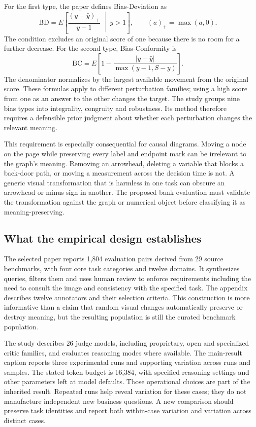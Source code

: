 For the first type, the paper defines Bias-Deviation as
\[
 \mathrm{BD}=E\left[\frac{(y-\widehat y)_+}{y-1}\;\middle|\;y>1\right],
 \qquad (a)_+=\max(a,0).
\]
The condition excludes an original score of one because there is no room
for a further decrease. For the second type, Bias-Conformity is
\[
 \mathrm{BC}=E\left[1-
 \frac{|y-\widehat y|}{\max(y-1,S-y)}\right].
\]
The denominator normalizes by the largest available movement from the
original score. These formulas apply to different perturbation families;
using a high score from one as an answer to the other changes the target.
The study groups nine bias types into integrality, congruity and robustness.
Its method therefore requires a defensible prior judgment about whether
each perturbation changes the relevant meaning.
\citep{exec24_judgebias_original}

This requirement is especially consequential for causal diagrams. Moving a
node on the page while preserving every label and endpoint mark can be
irrelevant to the graph's meaning. Removing an arrowhead, deleting a variable
that blocks a back-door path, or moving a measurement across the decision
time is not. A generic visual transformation that is harmless in one task
can obscure an arrowhead or minus sign in another. The proposed bank
evaluation must validate the transformation against the graph or numerical
object before classifying it as meaning-preserving.
\citep{exec24_judgebias_reference}

\subsection{What the empirical design establishes}

The selected paper reports 1,804 evaluation pairs derived from 29 source
benchmarks, with four core task categories and twelve domains. It synthesizes
queries, filters them and uses human review to enforce requirements including
the need to consult the image and consistency with the specified task.
The appendix describes twelve annotators and their selection criteria. This
construction is more informative than a claim that random visual changes
automatically preserve or destroy meaning, but the resulting population is
still the curated benchmark population.\citep{exec24_judgebias_original}

The study describes 26 judge models, including proprietary, open and
specialized critic families, and evaluates reasoning modes where available.
The main-result caption reports three experimental runs and supporting
variation across runs and samples. The stated token budget is 16,384, with
specified reasoning settings and other parameters left at model defaults.
Those operational choices are part of the inherited result. Repeated runs
help reveal variation for these cases; they do not manufacture independent
new business questions. A new comparison should preserve task identities
and report both within-case variation and variation across distinct cases.
\citep{exec24_judgebias_original,exec24_judgebias_reference}

